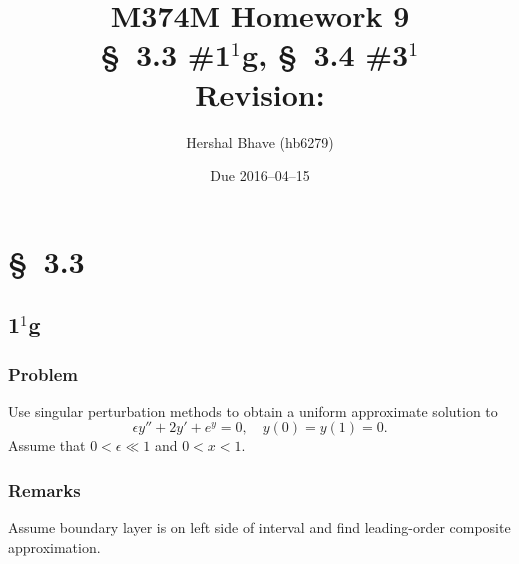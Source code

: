 \documentclass[12pt,twoside]{article}
\title{M374M Homework 9 \\
  \normalsize{\S~3.3 \#1$^1$g, \S~3.4 \#3$^1$} \\
  Revision: }
\author{Hershal Bhave (hb6279)}
\date{Due 2016--04--15}
\begin{document}
\maketitle

\section{\S~3.3}
\subsection{1$^1$g}
\subsubsection*{Problem}
Use singular perturbation methods to obtain a uniform approximate solution to
\begin{equation}
  \label{eq:3.3.1g-problem}
  \epsilon y''+2y'+e^y=0,\quad y(0)=y(1)=0.
\end{equation}
Assume that $0<\epsilon\ll1$ and $0<x<1$.
\subsubsection*{Remarks}
Assume boundary layer is on left side of interval and find leading-order
composite approximation.
\end{document}

